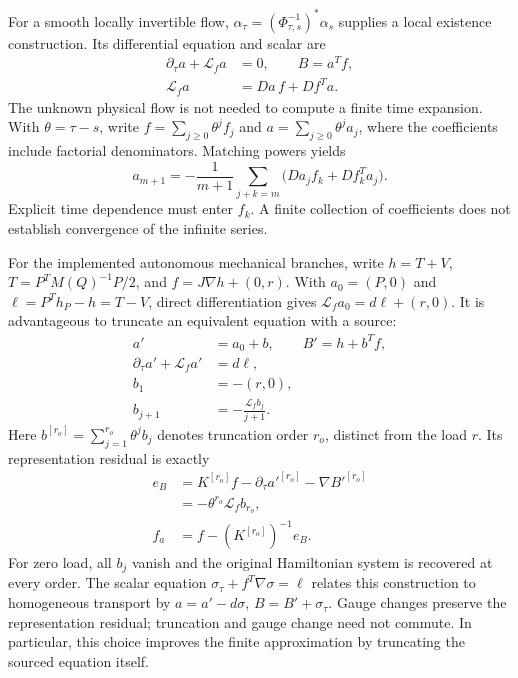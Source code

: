 For a smooth locally invertible flow, $\alpha_\tau=(\Phi_{\tau,s}^{-1})^*\alpha_s$ supplies a local existence construction. Its differential equation and scalar are
\begin{equation}
 \begin{aligned}
 \partial_\tau a+\mathcal L_fa&=0,\qquad B=a^Tf,\\
 \mathcal L_fa&=Da\,f+Df^Ta.
\end{aligned}
 \label{eq:th-homogeneous}
\end{equation}
The unknown physical flow is not needed to compute a finite time expansion. With $\theta=\tau-s$, write $f=\sum_{j\ge0}\theta^j f_j$ and $a=\sum_{j\ge0}\theta^j a_j$, where the coefficients include factorial denominators. Matching powers yields
\begin{equation}
 a_{m+1}=-\frac1{m+1}\sum_{j+k=m}
       \bigl(Da_j f_k+Df_k^Ta_j\bigr).
 \label{eq:th-time-recursion}
\end{equation}
Explicit time dependence must enter $f_k$. A finite collection of coefficients does not establish convergence of the infinite series.

For the implemented autonomous mechanical branches, write
$h=T+V$, $T=P^TM(Q)^{-1}P/2$, and $f=J\nabla h+(0,r)$. With $a_0=(P,0)$ and $\ell=P^Th_P-h=T-V$, direct differentiation gives $\mathcal L_fa_0=d\ell+(r,0)$. It is advantageous to truncate an equivalent equation with a source:
\begin{equation}
 \begin{aligned}
 a'&=a_0+b,\qquad B'=h+b^Tf,\\
 \partial_\tau a'+\mathcal L_fa'&=d\ell,\\
 b_1&=-(r,0),\\
 b_{j+1}&=-\frac{\mathcal L_fb_j}{j+1}.
\end{aligned}
 \label{eq:th-source}
\end{equation}
Here $b^{[r_o]}=\sum_{j=1}^{r_o}\theta^jb_j$ denotes truncation order $r_o$, distinct from the load $r$. Its representation residual is exactly
\begin{equation}
 \begin{aligned}
 e_B&=K^{[r_o]}f-\partial_\tau a'^{[r_o]}-\nabla B'^{[r_o]}\\
    &=-\theta^{r_o}\mathcal L_fb_{r_o},\\
 f_a&=f-(K^{[r_o]})^{-1}e_B .
\end{aligned}
 \label{eq:th-source-residual}
\end{equation}
For zero load, all $b_j$ vanish and the original Hamiltonian system is recovered at every order. The scalar equation $\sigma_\tau+f^T\nabla\sigma=\ell$ relates this construction to homogeneous transport by $a=a'-d\sigma$, $B=B'+\sigma_\tau$. Gauge changes preserve the representation residual; truncation and gauge change need not commute. In particular, this choice improves the finite approximation by truncating the sourced equation itself.

